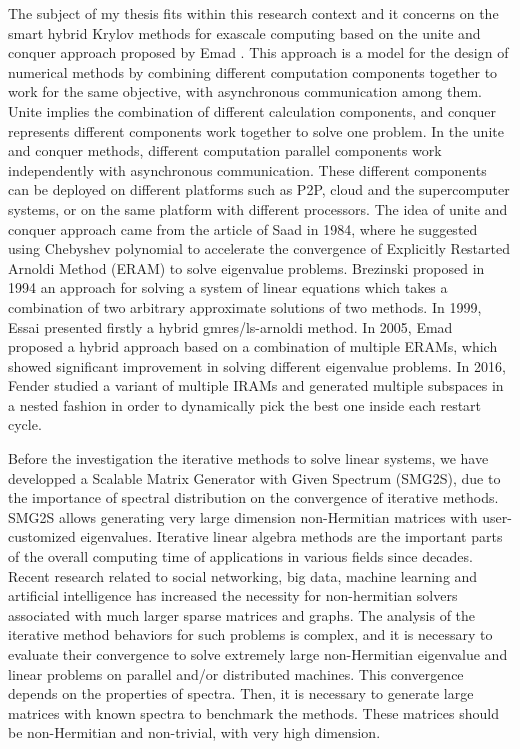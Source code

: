 The subject of my thesis fits within this research context and it concerns on the smart hybrid Krylov methods for exascale computing based on the unite and conquer approach proposed by Emad \cite{emad2016unite}. This approach is a model for the design of numerical methods by combining different computation components together to work for the same objective, with asynchronous communication among them. Unite implies the combination of different calculation components, and conquer represents different components work together to solve one problem. In the unite and conquer methods, different computation parallel components work independently with asynchronous communication. These different components can be deployed on different platforms such as P2P, cloud and the supercomputer systems, or on the same platform with different processors. The idea of unite and conquer approach came from the article of Saad \cite{saad1984chebyshev} in 1984, where he suggested using Chebyshev polynomial to accelerate the convergence of Explicitly Restarted Arnoldi Method (ERAM) to solve eigenvalue problems. Brezinski \cite{brezinski1994hybrid} proposed in 1994 an approach for solving a system of linear equations which takes a combination of two arbitrary approximate solutions of two methods. In 1999, Essai \cite{essai1999heterogeneous} presented firstly a hybrid gmres/ls-arnoldi method. In 2005, Emad \cite{emad2005multiple} proposed a hybrid approach based on a combination of multiple ERAMs, which showed significant improvement in solving different eigenvalue problems. In 2016, Fender \cite{fender2016leveraging} studied a variant of multiple IRAMs and generated multiple subspaces in a nested fashion in order to dynamically pick the best one inside each restart cycle.

Before the investigation the iterative methods to solve linear systems, we have developped a Scalable Matrix Generator with Given Spectrum (SMG2S), due to the importance of spectral distribution on the convergence of iterative methods. SMG2S allows generating very large dimension non-Hermitian matrices with user-customized eigenvalues. Iterative linear algebra methods are the important parts of the overall computing time of applications in various fields since decades. Recent research related to social networking, big data, machine learning and artificial intelligence has increased the necessity for non-hermitian solvers associated with much larger sparse matrices and graphs. The analysis of the iterative method behaviors for such problems is complex, and it is necessary to evaluate their convergence to solve extremely large non-Hermitian eigenvalue and linear problems on parallel and/or distributed machines. This convergence depends on the properties of spectra. Then, it is necessary to generate large matrices with known spectra to benchmark the methods. These matrices should be non-Hermitian and non-trivial, with very high dimension.

